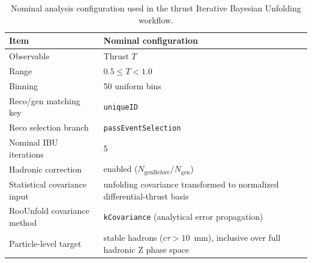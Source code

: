 \begin{table}[t!]
\centering
\begin{tabularx}{0.98\textwidth}{p{} X}
\hline
Item & Nominal configuration \\
\hline
Observable & Thrust $T$ \\
Range & $0.5 \le T < 1.0$ \\
Binning & 50 uniform bins \\
Reco/gen matching key & \texttt{uniqueID} \\
Reco selection branch & \texttt{passEventSelection} \\
Nominal IBU iterations & 5 \\
Hadronic correction & enabled ($N_{\mathrm{genBefore}}/N_{\mathrm{gen}}$) \\
Statistical covariance input & unfolding covariance transformed to normalized differential-thrust basis \\
RooUnfold covariance method & \texttt{kCovariance} (analytical error propagation) \\
Particle-level target & stable hadrons ($c\tau > 10$~mm), inclusive over full hadronic Z phase space \\
\hline
\end{tabularx}
\caption{Nominal analysis configuration used in the thrust Iterative Bayesian Unfolding workflow.}
\label{tab:method_config}
\end{table}
